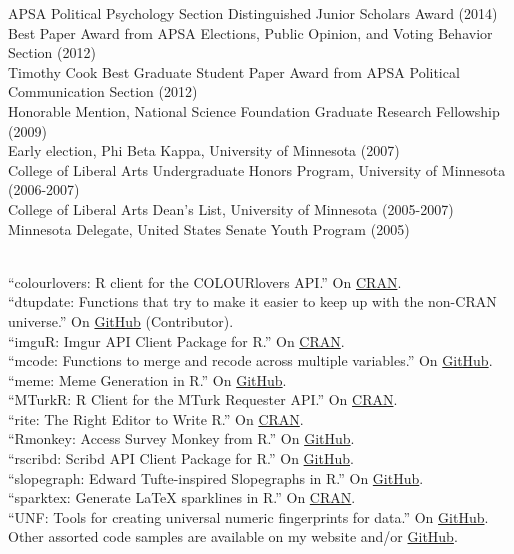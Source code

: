 \documentclass[12pt]{article}
\renewcommand{\section}[1]{\pagebreak[3]%
    \llap{\scshape\smash{\parbox[t]{\marginparwidth}{\raggedright {\color{lg}#1}}}}%
    \vspace{-\baselineskip}\par}
\newcommand{\topic}[1]{\pagebreak[3]\indent {\color{lg}{\footnotesize #1 }}\\}
\newcommand{\entry}[1]{\indent {\color{lg}\guillemotright}\hspace{2pt}#1\vspace{.25em}\\}
\begin{document}
\section{Honors\\and\\Awards}
\entry{APSA Political Psychology Section Distinguished Junior Scholars Award (2014)}
\entry{Best Paper Award from APSA Elections, Public Opinion, and Voting Behavior Section (2012)}
\entry{Timothy Cook Best Graduate Student Paper Award from APSA Political Communication Section (2012)}
\entry{Honorable Mention, National Science Foundation Graduate Research Fellowship (2009)}
\entry{Early election, Phi Beta Kappa, University of Minnesota (2007)}
\entry{College of Liberal Arts Undergraduate Honors Program, University of Minnesota (2006-2007)}
\entry{College of Liberal Arts Dean's List, University of Minnesota (2005-2007)}
\entry{Minnesota Delegate, United States Senate Youth Program (2005)}

\section{Software}
\topic{R packages}
\entry{``colourlovers: R client for the COLOURlovers API.'' On \href{http://cran.r-project.org/web/packages/colourlovers/index.html}{CRAN}.}
\entry{``dtupdate: Functions that try to make it easier to keep up with the non-CRAN universe.'' On \href{https://github.com/hrbrmstr/dtupdate}{GitHub} (Contributor).}
\entry{``imguR: Imgur API Client Package for R.'' On \href{http://cran.r-project.org/web/packages/imguR/index.html}{CRAN}.}
\entry{``mcode: Functions to merge and recode across multiple variables.'' On \href{https://github.com/leeper/mcode}{GitHub}.}
\entry{``meme: Meme Generation in R.'' On \href{https://github.com/leeper/meme}{GitHub}.}
\entry{``MTurkR: R Client for the MTurk Requester API.'' On \href{http://cran.r-project.org/web/packages/MTurkR/index.html}{CRAN}.}
\entry{``rite: The Right Editor to Write R.'' On \href{http://cran.r-project.org/web/packages/rite/index.html}{CRAN}.}
\entry{``Rmonkey: Access Survey Monkey from R.'' On \href{https://github.com/leeper/Rmonkey}{GitHub}.}
\entry{``rscribd: Scribd API Client Package for R.'' On \href{https://github.com/leeper/rscribd}{GitHub}.}
\entry{``slopegraph: Edward Tufte-inspired Slopegraphs in R.'' On \href{https://github.com/leeper/slopegraph}{GitHub}.}
\entry{``sparktex: Generate LaTeX sparklines in R.'' On \href{http://cran.r-project.org/web/packages/sparktex/index.html}{CRAN}.}
\entry{``UNF: Tools for creating universal numeric fingerprints for data.'' On \href{https://github.com/leeper/UNF}{GitHub}.}
\entry{Other assorted code samples are available on my website and/or \href{http://github.com/leeper}{GitHub}.}
\end{document}
